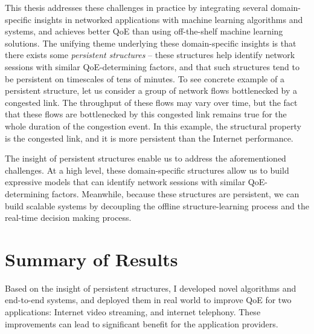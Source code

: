 This thesis addresses these challenges in practice by integrating 
several domain-specific insights in networked applications with 
machine learning algorithms and systems, and achieves better QoE 
than using off-the-shelf machine learning solutions. 
The unifying theme underlying these domain-specific insights is 
that there exists some {\em persistent structures} -- 
these structures help identify network sessions with similar 
QoE-determining factors, and that such structures tend to be 
persistent on timescales of tens of minutes.
To see concrete example of a persistent structure, let us consider 
a group of network flows bottlenecked by a congested link.
The throughput of these flows may vary over time, but the fact
that these flows are bottlenecked by this congested link remains true 
for the whole duration of the congestion event.
In this example, the structural property is the congested link, and 
it is more persistent than the Internet performance.

The insight of persistent structures enable us to address the 
aforementioned challenges.
At a high level, these domain-specific structures 
allow us to build expressive models that can identify network 
sessions with similar QoE-determining factors.
Meanwhile, because these structures are persistent, we can 
build scalable systems by decoupling the offline structure-learning 
process and the real-time decision making process.



\section{Summary of Results}

Based on the insight of persistent structures, I developed novel algorithms 
and end-to-end systems, and deployed them in real world to 
improve QoE for two applications: Internet video streaming, 
and internet telephony. 
These improvements can lead to significant benefit for the application providers.





